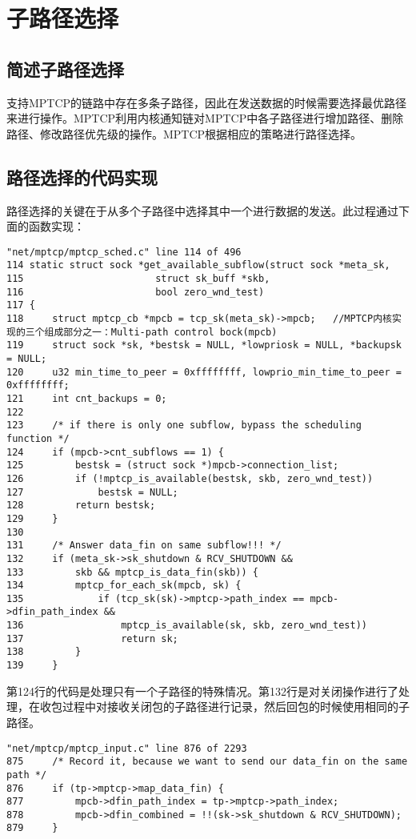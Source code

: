 \section{子路径选择}
\subsection{简述子路径选择}
支持MPTCP的链路中存在多条子路径，因此在发送数据的时候需要选择最优路径来进行操作。MPTCP利用内核通知链对MPTCP中各子路径进行增加路径、删除路径、修改路径优先级的操作。MPTCP根据相应的策略进行路径选择。
\subsection{路径选择的代码实现}
路径选择的关键在于从多个子路径中选择其中一个进行数据的发送。此过程通过下面的函数实现：
\small\begin{verbatim}
"net/mptcp/mptcp_sched.c" line 114 of 496
114 static struct sock *get_available_subflow(struct sock *meta_sk,
115                       struct sk_buff *skb,
116                       bool zero_wnd_test)
117 {
118     struct mptcp_cb *mpcb = tcp_sk(meta_sk)->mpcb;   //MPTCP内核实现的三个组成部分之一：Multi-path control bock(mpcb)
119     struct sock *sk, *bestsk = NULL, *lowpriosk = NULL, *backupsk = NULL;
120     u32 min_time_to_peer = 0xffffffff, lowprio_min_time_to_peer = 0xffffffff;
121     int cnt_backups = 0;
122
123     /* if there is only one subflow, bypass the scheduling function */
124     if (mpcb->cnt_subflows == 1) {
125         bestsk = (struct sock *)mpcb->connection_list;
126         if (!mptcp_is_available(bestsk, skb, zero_wnd_test))
127             bestsk = NULL;
128         return bestsk;
129     }
130
131     /* Answer data_fin on same subflow!!! */
132     if (meta_sk->sk_shutdown & RCV_SHUTDOWN &&
133         skb && mptcp_is_data_fin(skb)) {
134         mptcp_for_each_sk(mpcb, sk) {
135             if (tcp_sk(sk)->mptcp->path_index == mpcb->dfin_path_index &&
136                 mptcp_is_available(sk, skb, zero_wnd_test))
137                 return sk;
138         }
139     }
\end{verbatim}\normalsize
第124行的代码是处理只有一个子路径的特殊情况。第132行是对关闭操作进行了处理，在收包过程中对接收关闭包的子路径进行记录，然后回包的时候使用相同的子路径。
\small\begin{verbatim}
"net/mptcp/mptcp_input.c" line 876 of 2293
875     /* Record it, because we want to send our data_fin on the same path */
876     if (tp->mptcp->map_data_fin) {
877         mpcb->dfin_path_index = tp->mptcp->path_index;
878         mpcb->dfin_combined = !!(sk->sk_shutdown & RCV_SHUTDOWN);
879     }
\end{verbatim}\normalsize
